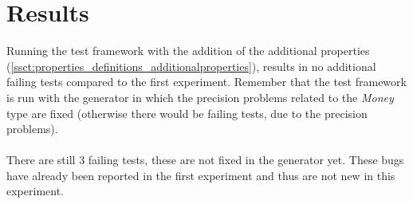 \section{Results}
Running the test framework with the addition of the additional properties (\autoref{ssct:properties_definitions_additionalproperties}), results in no additional failing tests compared to the first experiment. Remember that the test framework is run with the generator in which the precision problems related to the \textit{Money} type are fixed (otherwise there would be failing tests, due to the precision problems).\\
\\
There are still 3 failing tests, these are not fixed in the generator yet. These bugs have already been reported in the first experiment and thus are not new in this experiment.

